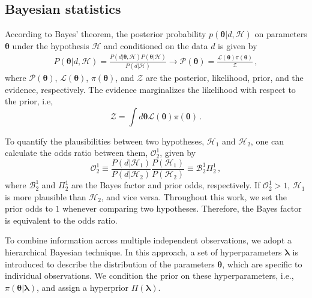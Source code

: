 \documentclass[prd,twocolumn,a4paper,floatfix,nofootinbib,preprintnumbers,superscriptaddress]{revtex4-1}
\begin{document}
\subsection{Bayesian statistics}\label{bayesian}
According to Bayes' theorem, the posterior probability $p(\boldsymbol{\theta} | d,\mathcal{H})$ on parameters $\boldsymbol{\theta}$ under the hypothesis $\mathcal{H}$ and conditioned on the data $d$ is given by
\begin{equation}
\begin{aligned}
        P(\boldsymbol{\theta} | d,\mathcal{H}) =  \frac{P(d|\boldsymbol{\theta},\mathcal{H})P(\boldsymbol{\theta}|\mathcal{H})}{P(d|\mathcal{H})} \to 
        \mathcal{P}(\boldsymbol{\theta}) =  \frac{\mathcal{L}(\boldsymbol{\theta})\pi(\boldsymbol{\theta})}{\mathcal{Z}}\,,
\end{aligned}
\end{equation}
where $\mathcal{P}(\boldsymbol{\theta})$, $\mathcal{L}(\boldsymbol{\theta})$, $\pi(\boldsymbol{\theta})$, and $\mathcal{Z}$ are the posterior, likelihood, prior, and the evidence, respectively. 
The evidence marginalizes the likelihood with respect to the prior, i.e,
\begin{equation}
    \mathcal{Z} = \int d\boldsymbol{\theta} \mathcal{L}(\boldsymbol{\theta})\pi(\boldsymbol{\theta})\,.
\end{equation}

To quantify the plausibilities between two hypotheses, $\mathcal{H}_1$ and $\mathcal{H}_2$, one can calculate the odds ratio between them, $\mathcal{O}^1_2$, given by
\begin{equation}
    \mathcal{O}^1_2 \equiv \frac{P(d|\mathcal{H}_1)}{P(d|\mathcal{H}_2)}\frac{P(\mathcal{H}_1)}{P(\mathcal{H}_2)} \equiv \mathcal{B}^1_2\Pi^1_2\,,
\end{equation}
where $\mathcal{B}^1_2$ and $\Pi^1_2$ are the Bayes factor and prior odds, respectively. 
If $\mathcal{O}^1_2 > 1$, $\mathcal{H}_1$ is more plausible than $\mathcal{H}_2$, and vice versa. Throughout this work, we set the prior odds to $1$ whenever comparing two hypotheses. Therefore, the Bayes factor is equivalent to the odds ratio.

To combine information across multiple independent observations, we adopt a hierarchical Bayesian technique. In this approach, a set of hyperparameters $\boldsymbol{\lambda}$ is introduced to describe the distribution of the parameters $\boldsymbol{\theta}$, which are specific to individual observations. We condition the prior on these hyperparameters, i.e., $\pi(\boldsymbol{\theta}|\boldsymbol{\lambda})$, and assign a hyperprior $\Pi(\boldsymbol{\lambda})$.
\end{document}
